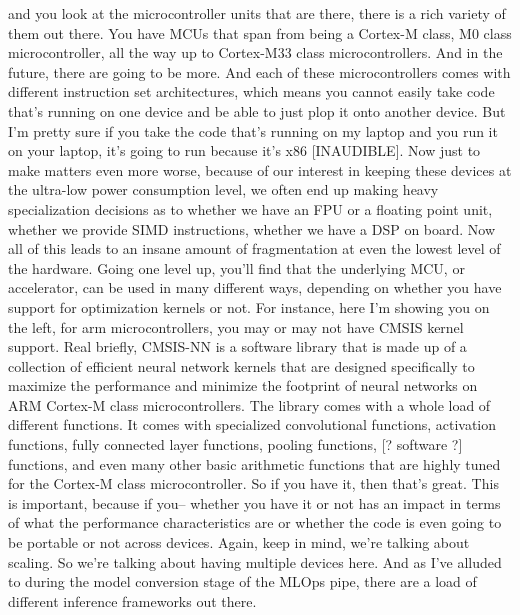 {{{{{     and you look at the microcontroller units that are there,
     there is a rich variety of them out there.
     You have MCUs that span from being a Cortex-M class, M0 class
     microcontroller, all the way up to Cortex-M33 class microcontrollers.
     And in the future, there are going to be more.
     And each of these microcontrollers comes with different instruction set
     architectures, which means you cannot easily take code that's running on one
     device and be able to just plop it onto another device.
     But I'm pretty sure if you take the code that's running on my laptop
     and you run it on your laptop, it's going
     to run because it's x86 [INAUDIBLE].
     Now just to make matters even more worse,
     because of our interest in keeping these devices at the ultra-low power
     consumption level, we often end up making heavy specialization decisions
     as to whether we have an FPU or a floating point unit,
     whether we provide SIMD instructions, whether we have a DSP on board.
     Now all of this leads to an insane amount of fragmentation
     at even the lowest level of the hardware.
     Going one level up, you'll find that the underlying MCU, or accelerator, can
     be used in many different ways, depending on whether you have support
     for optimization kernels or not.
     For instance, here I'm showing you on the left, for arm microcontrollers,
     you may or may not have CMSIS kernel support.
     Real briefly, CMSIS-NN is a software library
     that is made up of a collection of efficient neural network kernels
     that are designed specifically to maximize the performance
     and minimize the footprint of neural networks
     on ARM Cortex-M class microcontrollers.
     The library comes with a whole load of different functions.
     It comes with specialized convolutional functions, activation functions,
     fully connected layer functions, pooling functions, [? software ?] functions,
     and even many other basic arithmetic functions that are highly tuned
     for the Cortex-M class microcontroller.
     So if you have it, then that's great.
     This is important, because if you-- whether you have it or not
     has an impact in terms of what the performance characteristics are
     or whether the code is even going to be portable or not across devices.
     Again, keep in mind, we're talking about scaling.
     So we're talking about having multiple devices here.
     And as I've alluded to during the model conversion stage of the MLOps pipe,
     there are a load of different inference frameworks out there.
}}}}}
